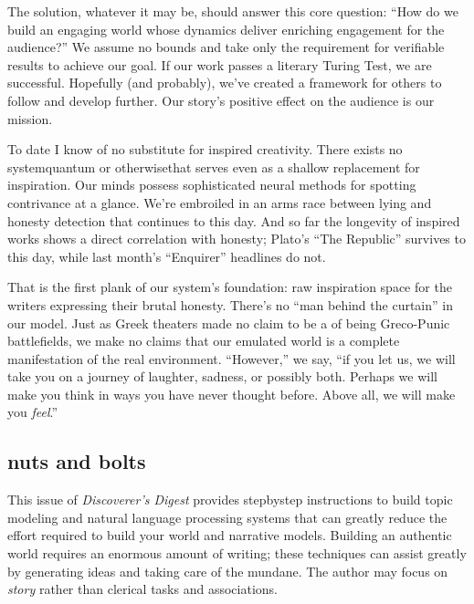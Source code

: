 The solution, whatever it may be, should answer this core question: ``How do we build
an engaging world whose dynamics deliver enriching engagement for the
audience?'' We assume no bounds and take only the requirement for verifiable
results to achieve our goal. If our work passes a literary Turing
Test, we are successful. Hopefully (and probably), we've created a
framework for others to follow and develop further. Our story's positive effect on the audience is our mission.

To date I know of no substitute for inspired creativity. There exists no
system\textemdash quantum or otherwise\textemdash that serves even as a shallow replacement
for inspiration. Our minds possess sophisticated neural methods for spotting
contrivance at a glance. We're embroiled in
an arms race between lying and honesty
detection that continues to this day. And so far the longevity of inspired works
shows a direct correlation with honesty; Plato's ``The Republic'' survives to this day, while last month's ``Enquirer'' headlines do not.

That is the first plank of our system's foundation: raw inspiration
space for the writers expressing their brutal honesty. There's no ``man behind the
curtain'' in our model. Just as Greek theaters made no claim to be
a of being Greco-Punic battlefields, we make no claims that our emulated world
is a complete manifestation of the real environment. ``However,'' we say, ``if you let
us, we will take you on a journey of laughter, sadness, or possibly both.
Perhaps we will make you think in ways you have never thought before. Above all, we will make you \textit{feel}.''


\subsection{nuts and bolts}

This issue of \textit{Discoverer's Digest} provides
step{\textendash}by{\textendash}step instructions to build topic modeling and natural language
processing systems that can greatly reduce the effort required to build your world and
narrative models. Building an authentic world requires an enormous amount of
writing; these techniques can assist greatly by generating ideas and taking care
of the mundane. The author may focus on \textit{story} rather than clerical
tasks and associations.

